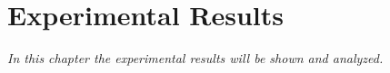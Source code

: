 \chapter{Experimental Results}
\label{cap:results}

\textit{In this chapter the experimental results will be shown and analyzed.}


\cleardoublepage
